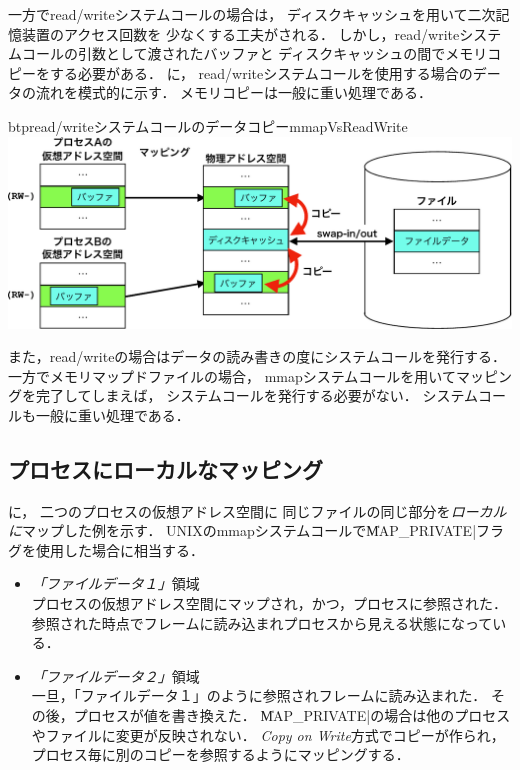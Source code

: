 一方でread/writeシステムコールの場合は，
ディスクキャッシュを用いて二次記憶装置のアクセス回数を
少なくする工夫がされる．
しかし，read/writeシステムコールの引数として渡されたバッファと
ディスクキャッシュの間でメモリコピーをする必要がある．
に，
read/writeシステムコールを使用する場合のデータの流れを模式的に示す．
メモリコピーは一般に重い処理である．

\begin{myfig}{btp}{read/writeシステムコールのデータコピー}{mmapVsReadWrite}
  \includegraphics[scale=0.66]{Fig/mmapVsReadWrite-crop.pdf}
\end{myfig}

また，read/writeの場合はデータの読み書きの度にシステムコールを発行する．
一方でメモリマップドファイルの場合，
mmapシステムコールを用いてマッピングを完了してしまえば，
システムコールを発行する必要がない．
システムコールも一般に重い処理である．

\subsection{プロセスにローカルなマッピング}
に，
二つのプロセスの仮想アドレス空間に
同じファイルの同じ部分を\emph{ローカルに}マップした例を示す．
UNIXのmmapシステムコールで\|MAP_PRIVATE|フラグを使用した場合に相当する．

\begin{itemize}
\item \emph{「ファイルデータ１」}領域 \\
プロセスの仮想アドレス空間にマップされ，かつ，プロセスに参照された．
参照された時点でフレームに読み込まれプロセスから見える状態になっている．
\item \emph{「ファイルデータ２」}領域 \\
一旦，「ファイルデータ１」のように参照されフレームに読み込まれた．
その後，プロセスが値を書き換えた．
\|MAP_PRIVATE|の場合は他のプロセスやファイルに変更が反映されない．
\emph{Copy on Write}方式でコピーが作られ，
プロセス毎に別のコピーを参照するようにマッピングする．
\end{itemize}

